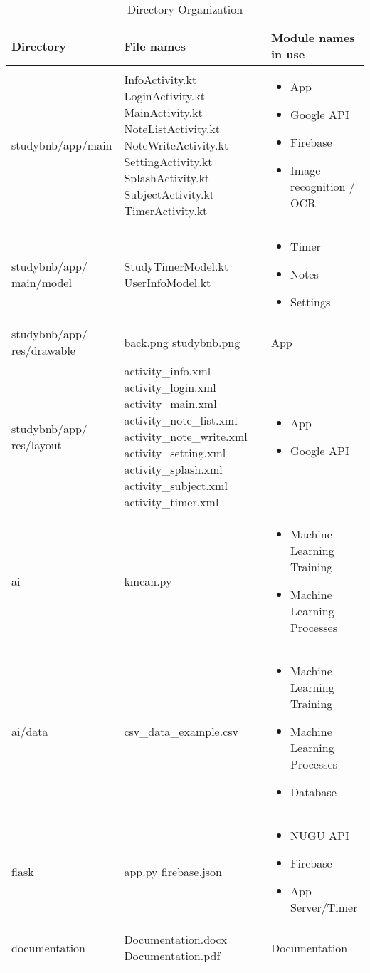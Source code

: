 \documentclass[conference]{IEEEtran}
\begin{document}
\begin{table}[H]
\caption{Directory Organization}
\begin{center}
\begin{tabular}{|p{2cm}|p{2.5cm}|p{2cm}|}
\hline
\textbf{Directory} & \textbf{File names} & \textbf{Module names in use} \\
\hline
studybnb/app/main &	InfoActivity.kt
LoginActivity.kt
MainActivity.kt
NoteListActivity.kt
NoteWriteActivity.kt
SettingActivity.kt
SplashActivity.kt
SubjectActivity.kt
TimerActivity.kt & 
\begin{itemize}
\item App
\item Google API
\item Firebase
\item Image recognition / OCR
\end{itemize}
 \\
\hline
studybnb/app/
main/model & StudyTimerModel.kt
UserInfoModel.kt & 
\begin{itemize}
\item Timer
\item Notes
\item Settings
\end{itemize}
 \\
\hline
studybnb/app/
res/drawable &	back.png
studybnb.png &	App
 \\
\hline
studybnb/app/
res/layout & activity\_info.xml
activity\_login.xml
activity\_main.xml
activity\_note\_list.xml
activity\_note\_write.xml
activity\_setting.xml
activity\_splash.xml
activity\_subject.xml
activity\_timer.xml & 
\begin{itemize}
\item App
\item Google API
\end{itemize}
 \\
\hline
ai & kmean.py &	
\begin{itemize}
\item Machine Learning Training
\item Machine Learning Processes
\end{itemize}
\\
\hline
ai/data	& csv\_data\_example.csv &	
\begin{itemize}
\item Machine Learning Training
\item Machine Learning Processes
\item Database
\end{itemize}
\\
\hline
flask &	app.py
firebase.json &	
\begin{itemize}
\item NUGU API
\item Firebase
\item App Server/Timer
\end{itemize}
\\
\hline
documentation &	Documentation.docx
Documentation.pdf & Documentation
\\
\hline
\end{tabular}
\end{center}
\end{table}
\end{document}
